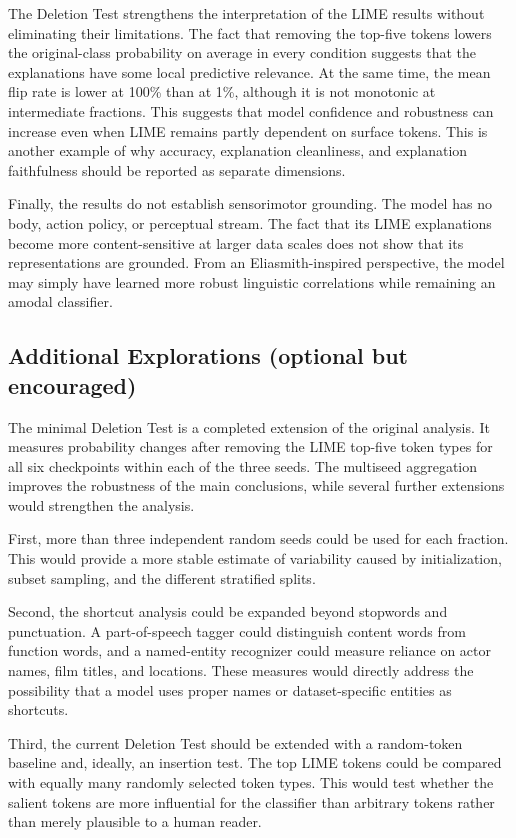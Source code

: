 \documentclass[11pt]{article}
\begin{document}
The Deletion Test strengthens the interpretation of the LIME results without eliminating their limitations. The fact that removing the top-five tokens lowers the original-class probability on average in every condition suggests that the explanations have some local predictive relevance. At the same time, the mean flip rate is lower at 100\% than at 1\%, although it is not monotonic at intermediate fractions. This suggests that model confidence and robustness can increase even when LIME remains partly dependent on surface tokens. This is another example of why accuracy, explanation cleanliness, and explanation faithfulness should be reported as separate dimensions.

Finally, the results do not establish sensorimotor grounding. The model has no body, action policy, or perceptual stream. The fact that its LIME explanations become more content-sensitive at larger data scales does not show that its representations are grounded. From an Eliasmith-inspired perspective, the model may simply have learned more robust linguistic correlations while remaining an amodal classifier.

\subsection{Additional Explorations (optional but encouraged)}

The minimal Deletion Test is a completed extension of the original analysis. It measures probability changes after removing the LIME top-five token types for all six checkpoints within each of the three seeds. The multiseed aggregation improves the robustness of the main conclusions, while several further extensions would strengthen the analysis.

First, more than three independent random seeds could be used for each fraction. This would provide a more stable estimate of variability caused by initialization, subset sampling, and the different stratified splits.

Second, the shortcut analysis could be expanded beyond stopwords and punctuation. A part-of-speech tagger could distinguish content words from function words, and a named-entity recognizer could measure reliance on actor names, film titles, and locations. These measures would directly address the possibility that a model uses proper names or dataset-specific entities as shortcuts.

Third, the current Deletion Test should be extended with a random-token baseline and, ideally, an insertion test. The top LIME tokens could be compared with equally many randomly selected token types. This would test whether the salient tokens are more influential for the classifier than arbitrary tokens rather than merely plausible to a human reader.
\end{document}
